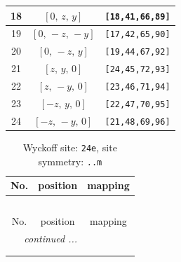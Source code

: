 \documentclass[fleqn,8pt]{jsarticle}
\begin{document}
\begin{longtable}{ccc}
18 & $\left[ 0,\, z,\, y \right]$ & {\tt [18,41,66,89]} \\ \hline
19 & $\left[ 0,\, - z,\, - y \right]$ & {\tt [17,42,65,90]} \\ \hline
20 & $\left[ 0,\, - z,\, y \right]$ & {\tt [19,44,67,92]} \\ \hline
21 & $\left[ z,\, y,\, 0 \right]$ & {\tt [24,45,72,93]} \\ \hline
22 & $\left[ z,\, - y,\, 0 \right]$ & {\tt [23,46,71,94]} \\ \hline
23 & $\left[ - z,\, y,\, 0 \right]$ & {\tt [22,47,70,95]} \\ \hline
24 & $\left[ - z,\, - y,\, 0 \right]$ & {\tt [21,48,69,96]} \\
\end{longtable}
\renewcommand{\arraystretch}{1.2}
\begin{longtable}{ccc}
\caption{Wyckoff site: {\tt 24e}, site symmetry: {\tt ..m}}
 \\
 \hline \hline
No. & position & mapping \\ \hline \endfirsthead

\multicolumn{2}{l}{\tablename\ \thetable{}} \\
 \hline \hline
No. & position & mapping \\ \hline \endhead

 \hline \hline
\multicolumn{2}{r}{\footnotesize\it continued ...} \\ \endfoot

 \hline \hline
\multicolumn{2}{r}{} \\ \endlastfoot


\end{longtable}
\end{document}
